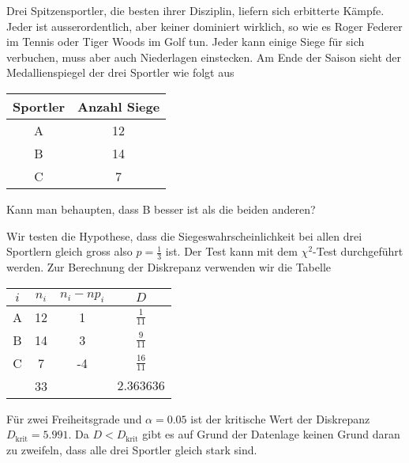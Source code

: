 Drei Spitzensportler, die besten ihrer Disziplin, liefern sich erbitterte
Kämpfe. Jeder ist ausserordentlich, aber keiner dominiert wirklich,
so wie es Roger Federer im Tennis oder Tiger Woods im Golf tun. Jeder
kann einige Siege für sich verbuchen, muss aber auch Niederlagen
einstecken. Am Ende der Saison sieht der Medallienspiegel der drei
Sportler wie folgt aus
\begin{center}
\begin{tabular}{|c|c|}
\hline
Sportler&Anzahl Siege\\
\hline
A&12\\
B&14\\
C&7\\
\hline
\end{tabular}
\end{center}
Kann man behaupten, dass B besser ist als die beiden anderen?

\begin{loesung}
Wir testen die Hypothese, dass die Siegeswahrscheinlichkeit bei allen
drei Sportlern gleich gross also $p=\frac13$ ist. Der Test kann mit
dem $\chi^2$-Test durchgeführt werden. Zur Berechnung der Diskrepanz
verwenden wir die Tabelle
\begin{center}
\begin{tabular}{|c|c|c|c|}
\hline
$i$&$n_i$&$n_i-np_i$&$D$\\
\hline
A&12&1&$\frac{1}{11}$\\
B&14&3&$\frac{9}{11}$\\
C& 7&-4&$\frac{16}{11}$\\
\hline
&33&&$2.363636$\\
\hline
\end{tabular}
\end{center}
Für zwei Freiheitsgrade und $\alpha=0.05$ ist der kritische Wert der
Diskrepanz $D_{\text{krit}}=5.991$. Da $D<D_{\text{krit}}$ gibt es
auf Grund der Datenlage keinen Grund daran zu zweifeln, dass alle drei
Sportler gleich stark sind.
\end{loesung}

